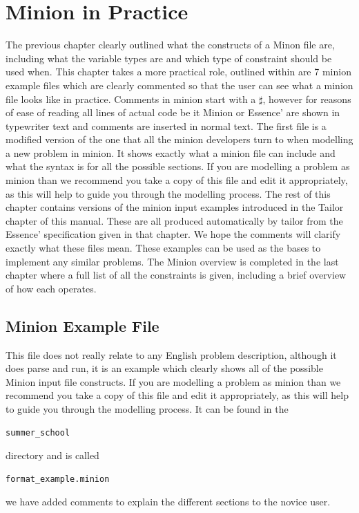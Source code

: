 \documentclass[oneside]{book}
\begin{document}
\chapter{Minion in Practice}
The previous chapter clearly outlined what the constructs of a Minon file are, including what the variable types are and which type of constraint should be used when. This chapter takes a more practical role, outlined within are 7 minion example files which are clearly commented so that the user can see what a minion file looks like in practice. Comments in minion start with a $\sharp$, however for reasons of ease of reading all lines of actual code be it Minion or Essence' are shown in typewriter text and comments are inserted in normal text. The first file is a modified version of the one that all the minion developers turn to when modelling a new problem in minion. It shows exactly what a minion file can include and what the syntax is for all the possible sections. If you are modelling a problem as minion than we recommend you take a copy of this file and edit it appropriately, as this will help to guide you through the modelling process. The rest of this chapter contains versions  of the minion input examples introduced in the Tailor chapter of this manual. These are all produced automatically by tailor from the Essence' specification given in that chapter. We hope the comments will clarify exactly what these files mean. These examples can be used as the bases to implement any similar problems. The Minion overview is completed in the last chapter where a full list of all the constraints is given, including a brief overview of how each operates. 

\section{Minion Example File}
This file does not really relate to any English problem description, although it does parse and run,  it is an example which clearly shows all of the possible Minion input file constructs. If you are modelling a problem as minion than we recommend you take a copy of this file and edit it appropriately, as this will help to guide you through the modelling process. It can be found in the \begin{verbatim}summer_school\end{verbatim} directory and is called \begin{verbatim}format_example.minion\end{verbatim} we have added comments  to explain the different sections to the novice user. 
\end{document}
